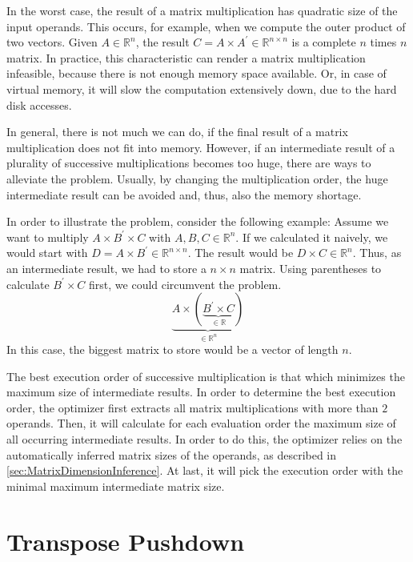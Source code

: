 In the worst case, the result of a matrix multiplication has quadratic size of the input operands.
This occurs, for example, when we compute the outer product of two vectors.
Given $A \in \mathbb{R}^{n}$, the result $C = A\times A^\prime \in \mathbb{R}^{n\times n}$ is a complete $n$ times $n$ matrix.
In practice, this characteristic can render a matrix multiplication infeasible, because there is not enough memory space available.
Or, in case of virtual memory, it will slow the computation extensively down, due to the hard disk accesses.

In general, there is not much we can do, if the final result of a matrix multiplication does not fit into memory.
However, if an intermediate result of a plurality of successive multiplications becomes too huge, there are ways to alleviate the problem.
Usually, by changing the multiplication order, the huge intermediate result can be avoided and, thus, also the memory shortage.

In order to illustrate the problem, consider the following example:
Assume we want to multiply $A\times B^\prime \times C$ with $A,B,C\in \mathbb{R}^{n}$.
If we calculated it naively, we would start with $D=A\times B^\prime \in \mathbb{R}^{n\times n}$.
The result would be $D\times C \in \mathbb{R}^{n}$.
Thus, as an intermediate result, we had to store a $n\times n$ matrix.
Using parentheses to calculate $B^\prime \times C$ first, we could circumvent the problem.
\begin{displaymath}
	\underbrace{A\times \left( \underbrace{B^\prime \times C}_{\in \mathbb{R}}\right)}_{\in \mathbb{R}^{n}}
\end{displaymath}
In this case, the biggest matrix to store would be a vector of length $n$.

The best execution order of successive multiplication is that which minimizes the maximum size of intermediate results.
In order to determine the best execution order, the optimizer first extracts all matrix multiplications with more than $2$ operands.
Then, it will calculate for each evaluation order the maximum size of all occurring intermediate results.
In order to do this, the optimizer relies on the automatically inferred matrix sizes of the operands, as described in \cref{sec:MatrixDimensionInference}.
At last, it will pick the execution order with the minimal maximum intermediate matrix size.

\section{Transpose Pushdown}

